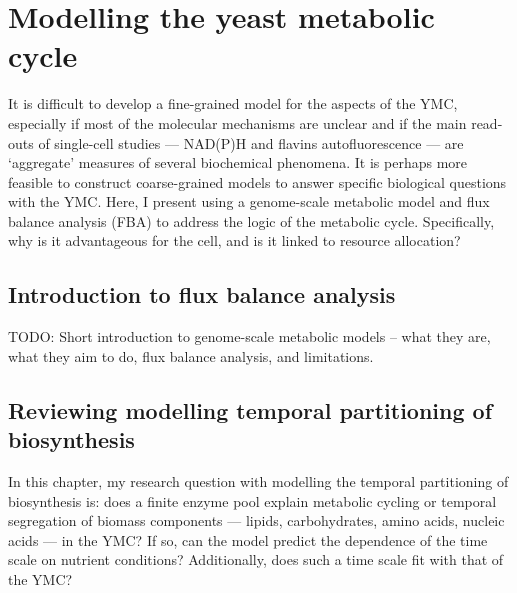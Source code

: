 \chapter{Modelling the yeast metabolic cycle}
\label{ch:model}

It is difficult to develop a fine-grained model for the aspects of the YMC,
especially if most of the molecular mechanisms are unclear
and if the main read-outs of single-cell studies --- NAD(P)H and flavins autofluorescence --- are `aggregate' measures of several biochemical phenomena.
It is perhaps more feasible to construct coarse-grained models to answer specific biological questions with the YMC.
Here, I present using a genome-scale metabolic model and flux balance analysis (FBA) to address the logic of the metabolic cycle.
Specifically, why is it advantageous for the cell, and is it linked to resource allocation?

\section{Introduction to flux balance analysis}
\label{sec:model-fba}

TODO: Short introduction to genome-scale metabolic models -- what they are, what they aim to do, flux balance analysis, and limitations.

\section{Reviewing modelling temporal partitioning of biosynthesis}
\label{sec:model-temporal}

In this chapter, my research question with modelling the temporal partitioning of biosynthesis is:
does a finite enzyme pool explain metabolic cycling or temporal segregation of biomass components --- lipids, carbohydrates, amino acids, nucleic acids --- in the YMC?
If so, can the model predict the dependence of the time scale on nutrient conditions?
Additionally, does such a time scale fit with that of the YMC?


